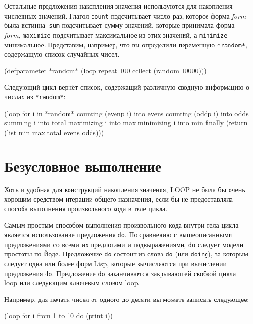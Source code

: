 Остальные предложения накопления значения используются для накопления численных
значений. Глагол \lstinline{count} подсчитывает число раз, которое форма \textit{form} была
истинна, \lstinline{sum} подсчитывает сумму значений, которые принимала форма \textit{form},
\lstinline{maximize} подсчитывает максимальное из этих значений, а \lstinline{minimize}~---
минимальное. Представим, например, что вы определили переменную \lstinline{*random*},
содержащую список случайных чисел.

\begin{myverb}
(defparameter *random* (loop repeat 100 collect (random 10000)))
\end{myverb}

Следующий цикл вернёт список, содержащий различную сводную информацию о числах из
\lstinline{*random*}:

\begin{myverb}
(loop for i in *random*
   counting (evenp i) into evens
   counting (oddp i) into odds
   summing i into total
   maximizing i into max
   minimizing i into min
   finally (return (list min max total evens odds)))
\end{myverb}

\section{Безусловное выполнение}

Хоть и удобная для конструкций накопления значения, LOOP не была бы очень хорошим
средством итерации общего назначения, если бы не предоставляла способа выполнения
произвольного кода в теле цикла.

Самым простым способом выполнения произвольного кода внутри тела цикла является
использование предложения \lstinline{do}. По сравнению с вышеописанными предложениями со всеми
их предлогами и подвыражениями, \lstinline{do} следует модели простоты по Йоде. Предложение \lstinline{do} состоит из слова \lstinline{do} (или \lstinline{doing}), за которым
следует одна или более форм Lisp, которые вычисляются при вычислении предложения
\lstinline{do}. Предложение \lstinline{do} заканчивается закрывающей скобкой цикла loop или
следующим ключевым словом loop.

Например, для печати чисел от одного до десяти вы можете записать следующее:

\begin{myverb}
(loop for i from 1 to 10 do (print i))
\end{myverb}

